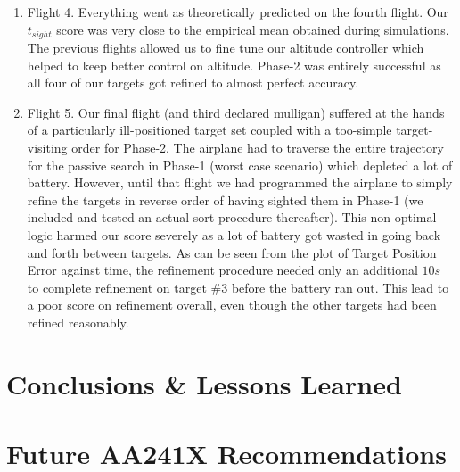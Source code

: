 \documentclass[11pt]{article}
\begin{document}
\begin{enumerate}
\item Flight 4. Everything went as theoretically predicted on the fourth flight. Our $t_{sight}$ score was very close to the empirical mean obtained during simulations. The previous flights allowed us to fine tune our altitude controller which helped to keep better control on altitude. Phase-2 was entirely successful as all four of our targets got refined to almost perfect accuracy.

\item Flight 5. Our final flight (and third declared mulligan) suffered at the hands of a particularly ill-positioned target set coupled with a too-simple target-visiting order for Phase-2. The airplane had to traverse the entire trajectory for the passive search in Phase-1 (worst case scenario) which depleted a lot of battery. However, until that flight we had programmed the airplane to simply refine the targets in reverse order of having sighted them in Phase-1 (we included and tested an actual sort procedure thereafter). This non-optimal logic harmed our score severely as a lot of battery got wasted in going back and forth between targets. As can be seen from the plot 	of Target Position Error against time, the refinement procedure needed only an additional $10 s$ to complete refinement on target $\#3$ before the battery ran out. This lead to a poor score on refinement overall, even though the other targets had been refined reasonably.

\end{enumerate}

\section{Conclusions \& Lessons Learned}
	\label{Conclusion}

\section{Future AA241X Recommendations}
	\label{Recommendations}
\end{document}
